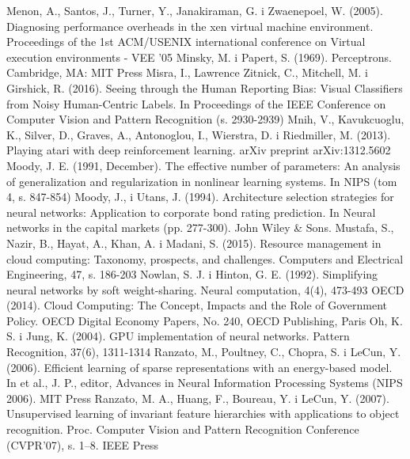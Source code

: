 \documentclass[12pt,a4paper,twoside]{article}
\begin{document}
\begin{thebibliography}{99}
 Menon, A., Santos, J., Turner, Y., Janakiraman, G. i Zwaenepoel, W. (2005). Diagnosing performance overheads in the xen virtual machine environment. Proceedings of the 1st ACM/USENIX international conference on Virtual execution environments - VEE '05
 Minsky, M. i Papert, S. (1969). Perceptrons. Cambridge, MA: MIT Press
 Misra, I., Lawrence Zitnick, C., Mitchell, M. i Girshick, R. (2016). Seeing through the Human Reporting Bias: Visual Classifiers from Noisy Human-Centric Labels. In Proceedings of the IEEE Conference on Computer Vision and Pattern Recognition (s. 2930-2939)
 Mnih, V., Kavukcuoglu, K., Silver, D., Graves, A., Antonoglou, I., Wierstra, D. i Riedmiller, M. (2013). Playing atari with deep reinforcement learning. arXiv preprint arXiv:1312.5602
 Moody, J. E. (1991, December). The effective number of parameters: An analysis of generalization and regularization in nonlinear learning systems. In NIPS (tom 4, s. 847-854)
 Moody, J., i Utans, J. (1994). Architecture selection strategies for neural networks: Application to corporate bond rating prediction. In Neural networks in the capital markets (pp. 277-300). John Wiley \& Sons.
 Mustafa, S., Nazir, B., Hayat, A., Khan, A. i Madani, S. (2015). Resource management in cloud computing: Taxonomy, prospects, and challenges. Computers and Electrical Engineering, 47, s. 186-203
 Nowlan, S. J. i Hinton, G. E. (1992). Simplifying neural networks by soft weight-sharing. Neural computation, 4(4), 473-493
 OECD (2014). Cloud Computing: The Concept, Impacts and the Role of Government Policy. OECD Digital Economy Papers, No. 240, OECD Publishing, Paris
 Oh, K. S. i Jung, K. (2004). GPU implementation of neural networks. Pattern Recognition, 37(6), 1311-1314
 Ranzato, M., Poultney, C., Chopra, S. i LeCun, Y. (2006). Efficient learning of sparse representations with an energy-based model. In et al., J. P., editor, Advances in Neural Information Processing Systems (NIPS 2006). MIT Press
 Ranzato, M. A., Huang, F., Boureau, Y. i LeCun, Y. (2007). Unsupervised learning of invariant feature hierarchies with applications to object recognition. Proc. Computer Vision and Pattern Recognition Conference (CVPR’07), s. 1–8. IEEE Press

\end{thebibliography}
\end{document}
